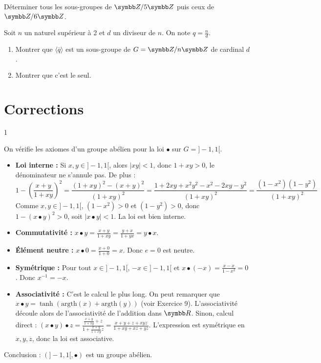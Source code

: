 \begin{exercice}
    Déterminer tous les sous-groupes de $\Z/5\Z$ puis ceux de $\Z/6\Z$.
\end{exercice}

\begin{exercice}
    Soit $n$ un naturel supérieur à 2 et $d$ un diviseur de $n$. On note $q=\frac{n}{d}$.
    \begin{enumerate}
        \item Montrer que $\langle \overline{q} \rangle$ est un sous-groupe de $G=\Z/n\Z$ de cardinal $d$.
        \item Montrer que c'est le seul.
    \end{enumerate}
\end{exercice}

\newpage
\section{Corrections}
\begin{correction}{1}

    On vérifie les axiomes d'un groupe abélien pour la loi $\bullet$ sur $G=]-1,1[$.
    \begin{itemize}
        \item \textbf{Loi interne :} Si $x,y \in ]-1,1[$, alors $|xy| < 1$, donc $1+xy > 0$, le dénominateur ne s'annule pas. De plus :
            \[1 - \left(\frac{x+y}{1+xy}\right)^2 = \frac{(1+xy)^2 - (x+y)^2}{(1+xy)^2} = \frac{1+2xy+x^2y^2 - x^2-2xy-y^2}{(1+xy)^2} = \frac{(1-x^2)(1-y^2)}{(1+xy)^2}\]
            Comme $x,y \in ]-1,1[$, $(1-x^2) > 0$ et $(1-y^2) > 0$, donc $1 - (x \bullet y)^2 > 0$, soit $|x \bullet y| < 1$. La loi est bien interne.
        \item \textbf{Commutativité :} $x \bullet y = \frac{x+y}{1+xy} = \frac{y+x}{1+yx} = y \bullet x$.
        \item \textbf{Élément neutre :} $x \bullet 0 = \frac{x+0}{1+0} = x$. Donc $e=0$ est neutre.
        \item \textbf{Symétrique :} Pour tout $x \in ]-1,1[$, $-x \in ]-1,1[$ et $x \bullet (-x) = \frac{x-x}{1-x^2} = 0$. Donc $x^{-1} = -x$.
        \item \textbf{Associativité :} C'est le calcul le plus long. On peut remarquer que $x \bullet y = \tanh(\text{argth}(x) + \text{argth}(y))$ (voir Exercice 9). 
            L'associativité découle alors de l'associativité de l'addition dans $\R$.
            Sinon, calcul direct :
            $(x \bullet y) \bullet z = \frac{\frac{x+y}{1+xy} + z}{1 + \frac{x+y}{1+xy}z} = \frac{x+y+z+xyz}{1+xy+xz+yz}$.
            L'expression est symétrique en $x,y,z$, donc la loi est associative.
    \end{itemize}
    Conclusion : $(]-1,1[, \bullet)$ est un groupe abélien.
\end{correction}

